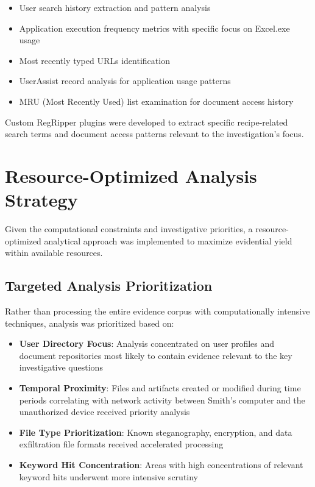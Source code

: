 \begin{itemize}
    \item User search history extraction and pattern analysis
    \item Application execution frequency metrics with specific focus on Excel.exe usage
    \item Most recently typed URLs identification
    \item UserAssist record analysis for application usage patterns
    \item MRU (Most Recently Used) list examination for document access history
\end{itemize}

Custom RegRipper plugins were developed to extract specific recipe-related search terms and document access patterns relevant to the investigation's focus.

\section{Resource-Optimized Analysis Strategy}
Given the computational constraints and investigative priorities, a resource-optimized analytical approach was implemented to maximize evidential yield within available resources.

\subsection{Targeted Analysis Prioritization}
Rather than processing the entire evidence corpus with computationally intensive techniques, analysis was prioritized based on:

\begin{itemize}
    \item \textbf{User Directory Focus}: Analysis concentrated on user profiles and document repositories most likely to contain evidence relevant to the key investigative questions
    
    \item \textbf{Temporal Proximity}: Files and artifacts created or modified during time periods correlating with network activity between Smith's computer and the unauthorized device received priority analysis
    
    \item \textbf{File Type Prioritization}: Known steganography, encryption, and data exfiltration file formats received accelerated processing
    
    \item \textbf{Keyword Hit Concentration}: Areas with high concentrations of relevant keyword hits underwent more intensive scrutiny
\end{itemize}

